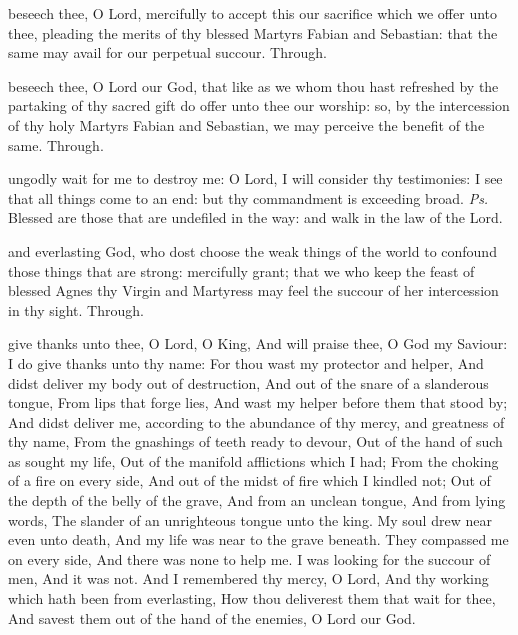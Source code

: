 
\secret
{} beseech thee, O Lord, mercifully to accept this our sacrifice which we offer unto thee, pleading the merits of thy blessed Martyrs Fabian and Sebastian: that the same may avail for our perpetual succour. Through.


\postcommunion
{} beseech thee, O Lord our God, that like as we whom thou hast refreshed by the partaking of thy sacred gift do offer unto thee our worship: so, by the intercession of thy holy Martyrs Fabian and Sebastian, we may perceive the benefit of the same. Through.



\introit
{} ungodly wait for me to destroy me: O Lord, I will consider thy testimonies: I see that all things come to an end: but thy commandment is exceeding broad. \textit{Ps.} Blessed are those that are undefiled in the way: and walk in the law of the Lord.

\collect
{} and everlasting God, who dost choose the weak things of the world to confound those things that are strong: mercifully grant; that we who keep the feast of blessed Agnes thy Virgin and Martyress may feel the succour of her intercession in thy sight. Through.

 give thanks unto thee, O Lord, O King, And will praise thee, O God my Saviour: I do give thanks unto thy name: For thou wast my protector and helper, And didst deliver my body out of destruction, And out of the snare of a slanderous tongue, From lips that forge lies, And wast my helper before them that stood by; And didst deliver me, according to the abundance of thy mercy, and greatness of thy name, From the gnashings of teeth ready to devour, Out of the hand of such as sought my life, Out of the manifold afflictions which I had; From the choking of a fire on every side, And out of the midst of fire which I kindled not; Out of the depth of the belly of the grave, And from an unclean tongue, And from lying words, The slander of an unrighteous tongue unto the king. My soul drew near even unto death, And my life was near to the grave beneath. They compassed me on every side, And there was none to help me. I was looking for the succour of men, And it was not. And I remembered thy mercy, O Lord, And thy working which hath been from everlasting, How thou deliverest them that wait for thee, And savest them out of the hand of the enemies, O Lord our God.

